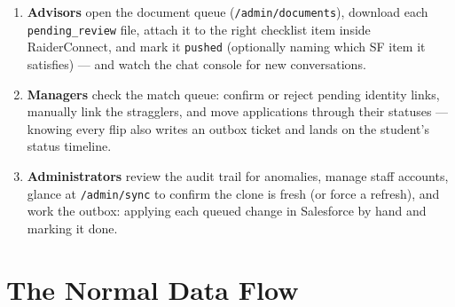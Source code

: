 \documentclass[11pt,letterpaper]{report}
\begin{document}
\begin{enumerate}[leftmargin=1.6em]
  \item \textbf{Advisors} open the document queue (\texttt{/admin/documents}),
        download each \texttt{pending\_review} file, attach it to the right
        checklist item inside RaiderConnect, and mark it \texttt{pushed}
        (optionally naming which SF item it satisfies) --- and watch the chat
        console for new conversations.
  \item \textbf{Managers} check the match queue: confirm or reject pending
        identity links, manually link the stragglers, and move applications
        through their statuses --- knowing every flip also writes an outbox
        ticket and lands on the student's status timeline.
  \item \textbf{Administrators} review the audit trail for anomalies, manage
        staff accounts, glance at \texttt{/admin/sync} to confirm the clone is
        fresh (or force a refresh), and work the outbox: applying each queued
        change in Salesforce by hand and marking it done.
\end{enumerate}

\section{The Normal Data Flow}
\end{document}
